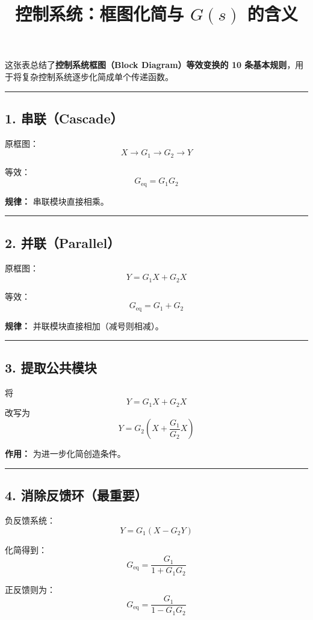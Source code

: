 \documentclass[UTF8,a4paper,11pt]{ctexart}
\title{控制系统：框图化简与 $G(s)$ 的含义}
\author{}
\date{}
\begin{document}
\maketitle

这张表总结了\textbf{控制系统框图（Block Diagram）等效变换的 10 条基本规则}，用于将复杂控制系统逐步化简成单个传递函数。

\bigskip\noindent\rule{\linewidth}{0.4pt}\bigskip

\subsection{1. 串联（Cascade）}

原框图：
\[
X \rightarrow G_1 \rightarrow G_2 \rightarrow Y
\]

等效：
\[
G_{\mathrm{eq}}=G_1G_2
\]

\textbf{规律：} 串联模块直接相乘。

\bigskip\noindent\rule{\linewidth}{0.4pt}\bigskip

\subsection{2. 并联（Parallel）}

原框图：
\[
Y=G_1X+G_2X
\]

等效：
\[
G_{\mathrm{eq}}=G_1+G_2
\]

\textbf{规律：} 并联模块直接相加（减号则相减）。

\bigskip\noindent\rule{\linewidth}{0.4pt}\bigskip

\subsection{3. 提取公共模块}

将
\[
Y=G_1X+G_2X
\]
改写为
\[
Y=G_2\left(X+\frac{G_1}{G_2}X\right)
\]

\textbf{作用：} 为进一步化简创造条件。

\bigskip\noindent\rule{\linewidth}{0.4pt}\bigskip

\subsection{4. 消除反馈环（最重要）}

负反馈系统：
\[
Y=G_1(X-G_2Y)
\]

化简得到：
\[
G_{\mathrm{eq}}=\frac{G_1}{1+G_1G_2}
\]

正反馈则为：
\[
G_{\mathrm{eq}}=\frac{G_1}{1-G_1G_2}
\]
\end{document}
